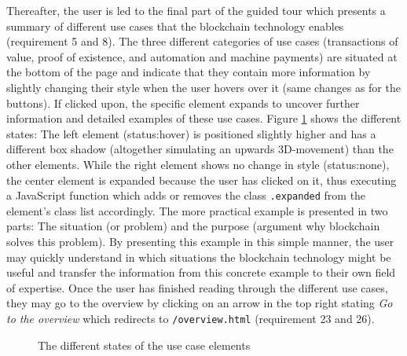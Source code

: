 Thereafter, the user is led to the final part of the guided tour which presents a summary of different use cases that the blockchain technology enables (requirement 5 and 8). The three different categories of use cases (transactions of value, proof of existence, and automation and machine payments) are situated at the bottom of the page and indicate that they contain more information by slightly changing their style when the user hovers over it (same changes as for the buttons). If clicked upon, the specific element expands to uncover further information and detailed examples of these use cases. Figure \ref{fig:AnimUC} shows the different states: The left element (status:hover) is positioned slightly higher and has a different box shadow (altogether simulating an upwards 3D-movement) than the other elements. While the right element shows no change in style (status:none), the center element is expanded because the user has clicked on it, thus executing a JavaScript function which adds or removes the class \texttt{.expanded} from the element's class list accordingly. The more practical example is presented in two parts: The situation (or problem) and the purpose (argument why blockchain solves this problem). By presenting this example in this simple manner, the user may quickly understand in which situations the blockchain technology might be useful and transfer the information from this concrete example to their own field of expertise. Once the user has finished reading through the different use cases, they may go to the overview by clicking on an arrow in the top right stating \textit{Go to the overview} which redirects to \texttt{/overview.html} (requirement 23 and 26). 

\begin{figure}
    \centering
    
    \caption{The different states of the use case elements}
    \label{fig:AnimUC}
\end{figure}


